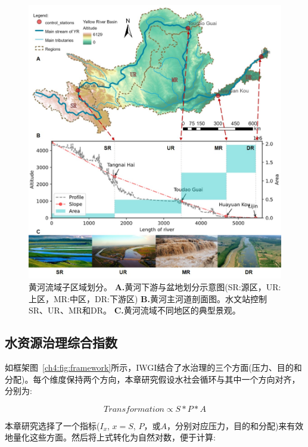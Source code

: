\begin{figure}[hbtp!]
\centering
\includegraphics[width=\textwidth]{img/ch4/s1_study_area.jpg}
\caption[黄河流域子区域划分]{黄河流域子区域划分。
    \textbf{A.}黄河下游与盆地划分示意图(SR:源区，UR:上区，MR:中区，DR:下游区)
    \textbf{B.}黄河主河道剖面图。水文站控制SR、UR、MR和DR。
    \textbf{C.}黄河流域不同地区的典型景观。
}
\label{fig:YRB}
\end{figure}


\subsection{水资源治理综合指数}

如框架图~\ref{ch4:fig:framework}所示，IWGI结合了水治理的三个方面(压力、目的和分配)。每个维度保持两个方向，本章研究假设水社会循环与其中一个方向对齐，分别为:

\begin{equation}
    Transformation \propto S*P*A
\end{equation}

本章研究选择了一个指标($I_x$, $x=S$, $P$，或$A$，分别对应压力，目的和分配)来有效地量化这些方面。然后将上式转化为自然对数，便于计算:

